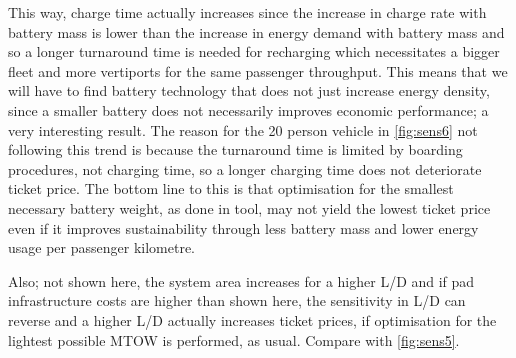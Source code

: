This way, charge time actually increases since the increase in charge rate with battery mass is lower than the increase in energy demand with battery mass and so a longer turnaround time is needed for recharging which necessitates a bigger fleet and more vertiports for the same passenger throughput. This means that we will have to find battery technology that does not just increase energy density, since a smaller battery does not necessarily improves economic performance; a very interesting result. The reason for the 20 person vehicle in \autoref{fig:sens6} not following this trend is because the turnaround time is limited by boarding procedures, not charging time, so a longer charging time does not deteriorate ticket price. The bottom line to this is that optimisation for the smallest necessary battery weight, as done in tool, may not yield the lowest ticket price even if it improves sustainability through less battery mass and lower energy usage per passenger kilometre.

Also; not shown here, the system area increases for a higher L/D and if pad infrastructure costs are higher than shown here, the sensitivity in L/D can reverse and a higher L/D actually increases ticket prices, if optimisation for the lightest possible MTOW is performed, as usual. Compare with \autoref{fig:sens5}.


